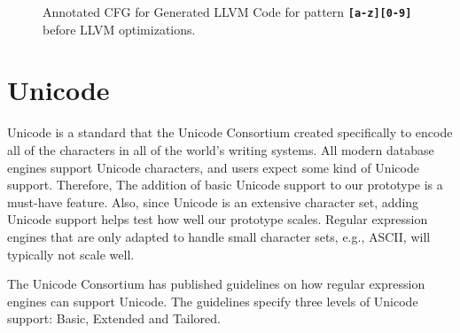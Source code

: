 \begin{figure}[H]
    \caption{Annotated CFG for Generated LLVM Code for pattern \texttt{\textbf{[a-z][0-9]}} before LLVM optimizations.}
    \label{fig:annocfg}
\end{figure}



\section{Unicode}
Unicode is a standard that the Unicode Consortium created specifically to encode all of the characters in all of the world's writing systems. All modern database engines support Unicode characters, and users expect some kind of Unicode support. Therefore, The addition of basic Unicode support to our prototype is a must-have feature. Also, since Unicode is an extensive character set, adding Unicode support helps test how well our prototype scales. Regular expression engines that are only adapted to handle small character sets, e.g., ASCII, will typically not scale well.

The Unicode Consortium has published guidelines \cite{unicodeguideline} on how regular expression engines can support Unicode. The guidelines specify three levels of Unicode support: Basic, Extended and Tailored.


